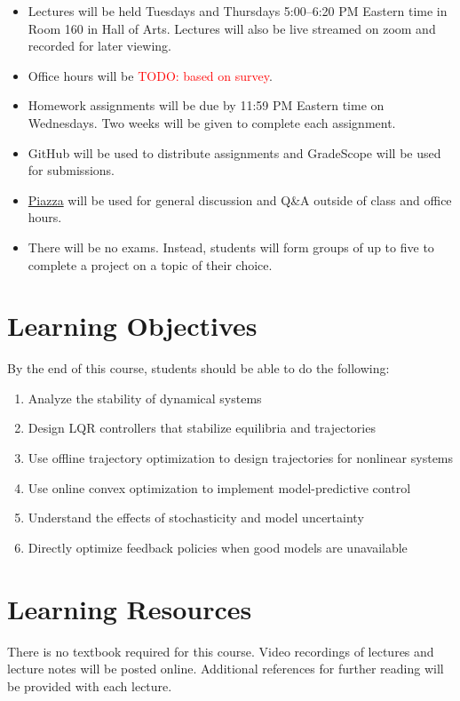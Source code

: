 \documentclass[11pt,letterpaper]{article}
\newcommand{\todo}[1]{\textcolor{red}{TODO: #1}}
\begin{document}
\begin{itemize}
	\item Lectures will be held Tuesdays and Thursdays 5:00--6:20 PM Eastern time in Room 160 in Hall of Arts. Lectures will also be live streamed on zoom and recorded for later viewing.
	\item Office hours will be \todo{based on survey}.
	\item Homework assignments will be due by 11:59 PM Eastern time on Wednesdays. Two weeks will be given to complete each assignment.
	\item GitHub will be used to distribute assignments and GradeScope will be used for submissions.
	\item \href{https://piazza.com/cmu/spring2023/16745/home}{Piazza} will be used for general discussion and Q\&A outside of class and office hours.
	\item There will be no exams. Instead, students will form groups of up to five to complete a project on a topic of their choice.
\end{itemize}

\section*{Learning Objectives}
By the end of this course, students should be able to do the following:
\begin{enumerate}
	\item Analyze the stability of dynamical systems
	\item Design LQR controllers that stabilize equilibria and trajectories
	\item Use offline trajectory optimization to design trajectories for nonlinear systems
	\item Use online convex optimization to implement model-predictive control
	\item Understand the effects of stochasticity and model uncertainty
	\item Directly optimize feedback policies when good models are unavailable
\end{enumerate}

\section*{Learning Resources}

There is no textbook required for this course. Video recordings of lectures and lecture notes will be posted online. Additional references for further reading will be provided with each lecture.
\end{document}
